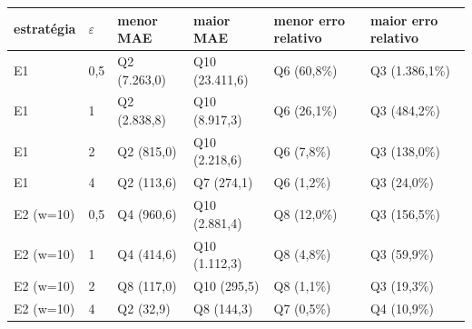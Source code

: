 \begin{tabular}{llllll}
\toprule
estratégia & $\varepsilon$ & menor MAE & maior MAE & menor erro relativo & maior erro relativo \\
\midrule
E1 & 0,5 & Q2 (7.263,0) & Q10 (23.411,6) & Q6 (60,8\%) & Q3 (1.386,1\%) \\
E1 & 1 & Q2 (2.838,8) & Q10 (8.917,3) & Q6 (26,1\%) & Q3 (484,2\%) \\
E1 & 2 & Q2 (815,0) & Q10 (2.218,6) & Q6 (7,8\%) & Q3 (138,0\%) \\
E1 & 4 & Q2 (113,6) & Q7 (274,1) & Q6 (1,2\%) & Q3 (24,0\%) \\
E2 (w=10) & 0,5 & Q4 (960,6) & Q10 (2.881,4) & Q8 (12,0\%) & Q3 (156,5\%) \\
E2 (w=10) & 1 & Q4 (414,6) & Q10 (1.112,3) & Q8 (4,8\%) & Q3 (59,9\%) \\
E2 (w=10) & 2 & Q8 (117,0) & Q10 (295,5) & Q8 (1,1\%) & Q3 (19,3\%) \\
E2 (w=10) & 4 & Q2 (32,9) & Q8 (144,3) & Q7 (0,5\%) & Q4 (10,9\%) \\
\bottomrule
\end{tabular}
